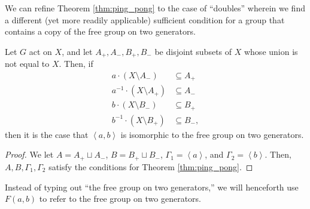 We can refine Theorem \ref{thm:ping_pong} to the case of ``doubles'' wherein we find a different (yet more readily applicable) sufficient condition for a group that contains a copy of the free group on two generators.
\begin{corollary}
  Let $G$ act on $X$, and let $A_{+}, A_{-},B_{+},B_{-}$ be disjoint subsets of $X$ whose union is not equal to $X$. Then, if
  \begin{align*}
    a\cdot \left(X\setminus A_{-}\right) &\subseteq A_{+}\\
    a^{-1}\cdot \left(X\setminus A_{+}\right) &\subseteq A_{-}\\
    b\cdot \left(X\setminus B_{-}\right) &\subseteq B_{+}\\
    b^{-1}\cdot \left(X\setminus B_{+}\right) &\subseteq B_{-},
  \end{align*}
  then it is the case that $\left\langle a,b \right\rangle$ is isomorphic to the free group on two generators.\label{corollary:ping_pong_doubles}
\end{corollary}
\begin{proof}
  We let $A = A_{+}\sqcup A_{-}$, $B = B_{+}\sqcup B_{-}$, $\Gamma_1 = \left\langle a \right\rangle$, and $\Gamma_2 = \left\langle b \right\rangle$. Then, $A,B,\Gamma_1,\Gamma_2$ satisfy the conditions for Theorem \ref{thm:ping_pong}.
\end{proof}
\begin{remark}
Instead of typing out ``the free group on two generators,'' we will henceforth use $F(a,b)$ to refer to the free group on two generators.
\end{remark}

